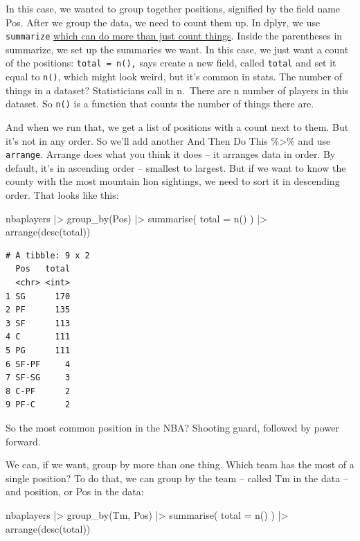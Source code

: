\documentclass[
  letterpaper,
  DIV=11,
  numbers=noendperiod]{scrreprt}
\newenvironment{Shaded}{\begin{snugshade}}{\end{snugshade}}
\newcommand{\AttributeTok}[1]{\textcolor[rgb]{0.40,0.45,0.13}{#1}}
\newcommand{\FunctionTok}[1]{\textcolor[rgb]{0.28,0.35,0.67}{#1}}
\newcommand{\NormalTok}[1]{\textcolor[rgb]{0.00,0.23,0.31}{#1}}
\newcommand{\SpecialCharTok}[1]{\textcolor[rgb]{0.37,0.37,0.37}{#1}}
\begin{document}
In this case, we wanted to group together positions, signified by the
field name Pos. After we group the data, we need to count them up. In
dplyr, we use \texttt{summarize}
\href{http://dplyr.tidyverse.org/reference/summarise.html}{which can do
more than just count things}. Inside the parentheses in summarize, we
set up the summaries we want. In this case, we just want a count of the
positions: \texttt{total\ =\ n(),} says create a new field, called
\texttt{total} and set it equal to \texttt{n()}, which might look weird,
but it's common in stats. The number of things in a dataset?
Statisticians call in n.~There are n number of players in this dataset.
So \texttt{n()} is a function that counts the number of things there
are.

And when we run that, we get a list of positions with a count next to
them. But it's not in any order. So we'll add another And Then Do This
\%\textgreater\% and use \texttt{arrange}. Arrange does what you think
it does -- it arranges data in order. By default, it's in ascending
order -- smallest to largest. But if we want to know the county with the
most mountain lion sightings, we need to sort it in descending order.
That looks like this:

\begin{Shaded}
\begin{Highlighting}[]
\NormalTok{nbaplayers }\SpecialCharTok{|\textgreater{}}
  \FunctionTok{group\_by}\NormalTok{(Pos) }\SpecialCharTok{|\textgreater{}}
  \FunctionTok{summarise}\NormalTok{(}
    \AttributeTok{total =} \FunctionTok{n}\NormalTok{()}
\NormalTok{  ) }\SpecialCharTok{|\textgreater{}} \FunctionTok{arrange}\NormalTok{(}\FunctionTok{desc}\NormalTok{(total))}
\end{Highlighting}
\end{Shaded}

\begin{verbatim}
# A tibble: 9 x 2
  Pos   total
  <chr> <int>
1 SG      170
2 PF      135
3 SF      113
4 C       111
5 PG      111
6 SF-PF     4
7 SF-SG     3
8 C-PF      2
9 PF-C      2
\end{verbatim}

So the most common position in the NBA? Shooting guard, followed by
power forward.

We can, if we want, group by more than one thing. Which team has the
most of a single position? To do that, we can group by the team --
called Tm in the data -- and position, or Pos in the data:

\begin{Shaded}
\begin{Highlighting}[]
\NormalTok{nbaplayers }\SpecialCharTok{|\textgreater{}}
  \FunctionTok{group\_by}\NormalTok{(Tm, Pos) }\SpecialCharTok{|\textgreater{}}
  \FunctionTok{summarise}\NormalTok{(}
    \AttributeTok{total =} \FunctionTok{n}\NormalTok{()}
\NormalTok{  ) }\SpecialCharTok{|\textgreater{}} \FunctionTok{arrange}\NormalTok{(}\FunctionTok{desc}\NormalTok{(total))}
\end{Highlighting}
\end{Shaded}
\end{document}
